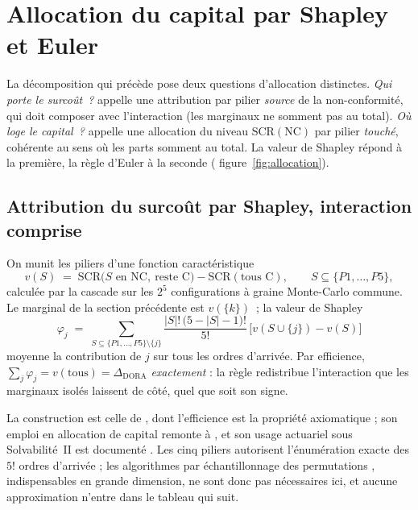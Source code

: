 \section{Allocation du capital par Shapley et Euler}

La décomposition qui précède pose deux questions d'allocation distinctes. \emph{Qui porte le
surcoût~?} appelle une attribution par pilier \emph{source} de la non-conformité, qui doit
composer avec l'interaction (les marginaux ne somment pas au total). \emph{Où loge le
capital~?} appelle une allocation du niveau $\mathrm{SCR}(\text{NC})$ par pilier
\emph{touché}, cohérente au sens où les parts somment au total. La valeur de Shapley répond
à la première, la règle d'Euler à la seconde (%
figure~\ref{fig:allocation}).

\subsection{Attribution du surcoût par Shapley, interaction comprise}

On munit les piliers d'une fonction caractéristique
\[
v(S) \;=\; \mathrm{SCR}\bigl(S \text{ en NC},\ \text{reste C}\bigr)-\mathrm{SCR}(\text{tous C}),
\qquad S \subseteq \{P1,\dots,P5\},
\]
calculée par la cascade sur les $2^5$ configurations à graine Monte-Carlo commune. Le
marginal de la section précédente est $v(\{k\})$~; la valeur de Shapley
\[
\varphi_j \;=\; \sum_{S \subseteq \{P1,\dots,P5\}\setminus\{j\}}
\frac{|S|!\,\bigl(5-|S|-1\bigr)!}{5!}\,\bigl[v(S\cup\{j\})-v(S)\bigr]
\]
moyenne la contribution de $j$ sur tous les ordres d'arrivée. Par efficience,
$\sum_j \varphi_j = v(\text{tous}) = \Delta_{\text{DORA}}$ \emph{exactement} : la règle
redistribue l'interaction que les marginaux isolés laissent de côté, quel que soit son signe.

La construction est celle de \citet{Shapley1953}, dont l'efficience est la propriété
axiomatique ; son emploi en allocation de capital remonte à \citet{denault2001}, et son usage
actuariel sous Solvabilité~II est documenté \citep{Decupere2011}. Les cinq piliers autorisent l'énumération exacte des $5!$
ordres d'arrivée ; les algorithmes par échantillonnage des permutations
\citep{CastroGomezTejada2009, SongNelsonStaum2016}, indispensables en grande dimension, ne
sont donc pas nécessaires ici, et aucune approximation n'entre dans le tableau qui suit.

